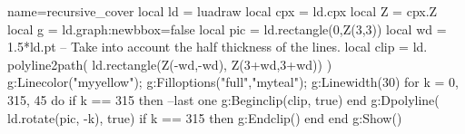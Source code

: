 \documentclass[border=5pt]{standalone}
\begin{document}
\begin{luadraw}{name=recursive_cover}
local ld = luadraw
local cpx = ld.cpx
local Z = cpx.Z
local g = ld.graph:new{bbox=false}
local pic = ld.rectangle(0,Z(3,3))
local wd = 1.5*ld.pt -- Take into account the half thickness of the lines.
local clip = ld. polyline2path( ld.rectangle(Z(-wd,-wd), Z(3+wd,3+wd)) )
g:Linecolor("myyellow"); g:Filloptions("full","myteal"); g:Linewidth(30)
for k = 0, 315, 45 do
    if k == 315 then --last one
        g:Beginclip(clip, true)
    end
    g:Dpolyline( ld.rotate(pic, -k), true)
    if k == 315 then g:Endclip() end
end
g:Show()
\end{luadraw}
\end{document}
